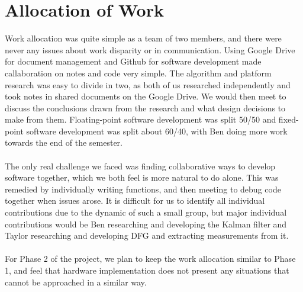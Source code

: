 \documentclass[11pt]{article} %
\begin{document}
\section{Allocation of Work}
Work allocation was quite simple as a team of two members, and there were never any issues about work disparity or in communication. Using Google Drive for document management and Github for software development made callaboration on notes and code very simple. The algorithm and platform research was easy to divide in two, as both of us researched independently and took notes in shared documents on the Google Drive. We would then meet to discuss the conclusions drawn from the research and what design decisions to make from them. Floating-point software development was split 50/50 and fixed-point software development was split about 60/40, with Ben doing more work towards the end of the semester. \\\\
The only real challenge we faced was finding collaborative ways to develop software together, which we both feel is more natural to do alone. This was remedied by individually writing functions, and then meeting to debug code together when issues arose. It is difficult for us to identify all individual contributions due to the dynamic of such a small group, but major individual contributions would be Ben researching and developing the Kalman filter and Taylor researching and developing DFG and extracting measurements from it. \\\\
For Phase 2 of the project, we plan to keep the work allocation similar to Phase 1, and feel that hardware implementation does not present any situations that cannot be approached in a similar way. 
\end{document}
